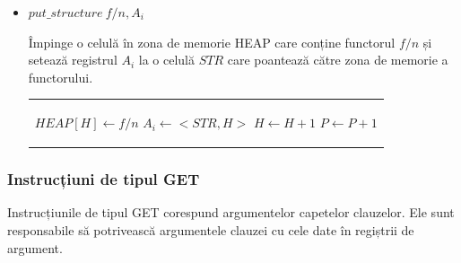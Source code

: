 \documentclass[12pt,a4paper,twoside]{report}
\begin{document}
\begin{itemize}
	\item \(put\_structure\ f/n, A_i\)\\
	\begin{minipage}{0.45\textwidth}
	Împinge o celulă în zona de memorie HEAP care conține functorul $f/n$ și setează registrul $A_i$ la o celulă $STR$ care poantează către zona de memorie a functorului. 
	\end{minipage}%
	\hfill
	\begin{minipage}{0.45\textwidth}
	\begin{tabular}{|p{\textwidth}}
	\begin{algorithmic}
		\State $HEAP[H] \leftarrow f/n$
		\State $A_i \leftarrow <STR, H>$
		\State $H \leftarrow H + 1$
		\State $P \leftarrow P + 1$
	\end{algorithmic}
	\end{tabular}
	\end{minipage}%
\end{itemize}

\subsubsection{Instrucțiuni de tipul GET}
Instrucțiunile de tipul GET corespund argumentelor capetelor clauzelor. Ele sunt responsabile să potrivească argumentele clauzei cu cele date în regiștrii de argument.
\end{document}
